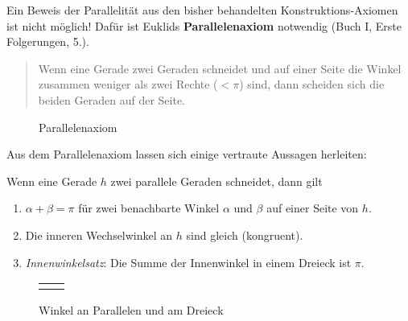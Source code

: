 Ein Beweis der Parallelität aus den bisher behandelten Konstruktions-Axiomen ist nicht möglich!
Dafür ist Euklids {\bf Parallelenaxiom} notwendig (Buch I, Erste Folgerungen, 5.).
\begin{quote}
Wenn eine Gerade %
zwei Geraden %
schneidet und auf einer Seite die Winkel
zusammen weniger als zwei Rechte ($<\pi$) sind, dann scheiden sich die beiden Geraden auf der Seite.
\end{quote}

\begin{figure}[h]
    
    \caption{Parallelenaxiom}
\end{figure}

Aus dem Parallelenaxiom lassen sich einige vertraute Aussagen herleiten:

\begin{thm}
    Wenn eine Gerade $h$ zwei parallele Geraden %
    schneidet, dann gilt
    \begin{enumerate}
        \item $\alpha + \beta = \pi$ für zwei benachbarte Winkel $\alpha$ und $\beta$  auf einer
        Seite von $h$.
        \item Die inneren Wechselwinkel an $h$ sind gleich (kongruent).
        \item {\em Innenwinkelsatz}: Die Summe der Innenwinkel in einem Dreieck ist $\pi$.
    \end{enumerate}
\end{thm}

\begin{figure}[h]
    \begin{tabular}{cc}
        
        &
        
    \end{tabular}
    \caption{Winkel an Parallelen und am Dreieck}
\end{figure}


